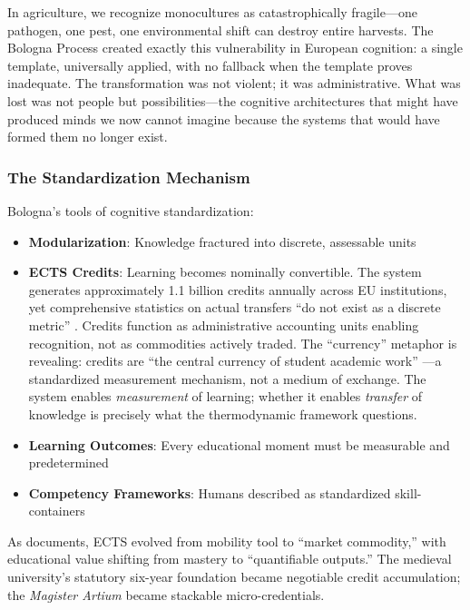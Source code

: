 In agriculture, we recognize monocultures as catastrophically fragile---one pathogen, one pest, one environmental shift can destroy entire harvests. The Bologna Process created exactly this vulnerability in European cognition: a single template, universally applied, with no fallback when the template proves inadequate. The transformation was not violent; it was administrative. What was lost was not people but possibilities---the cognitive architectures that might have produced minds we now cannot imagine because the systems that would have formed them no longer exist.

\subsubsection{The Standardization Mechanism}

Bologna's tools of cognitive standardization:

\begin{itemize}
    \item \textbf{Modularization}: Knowledge fractured into discrete, assessable units
    \item \textbf{ECTS Credits}: Learning becomes nominally convertible. The system generates approximately 1.1 billion credits annually across EU institutions, yet comprehensive statistics on actual transfers ``do not exist as a discrete metric'' \citep{davies2023}. Credits function as administrative accounting units enabling recognition, not as commodities actively traded. The ``currency'' metaphor is revealing: credits are ``the central currency of student academic work'' \citep{altbach2001}---a standardized measurement mechanism, not a medium of exchange. The system enables \textit{measurement} of learning; whether it enables \textit{transfer} of knowledge is precisely what the thermodynamic framework questions.
    \item \textbf{Learning Outcomes}: Every educational moment must be measurable and predetermined
    \item \textbf{Competency Frameworks}: Humans described as standardized skill-containers
\end{itemize}

As \citet{gleeson2021} documents, ECTS evolved from mobility tool to ``market commodity,'' with educational value shifting from mastery to ``quantifiable outputs.'' The medieval university's statutory six-year foundation became negotiable credit accumulation; the \textit{Magister Artium} became stackable micro-credentials.

